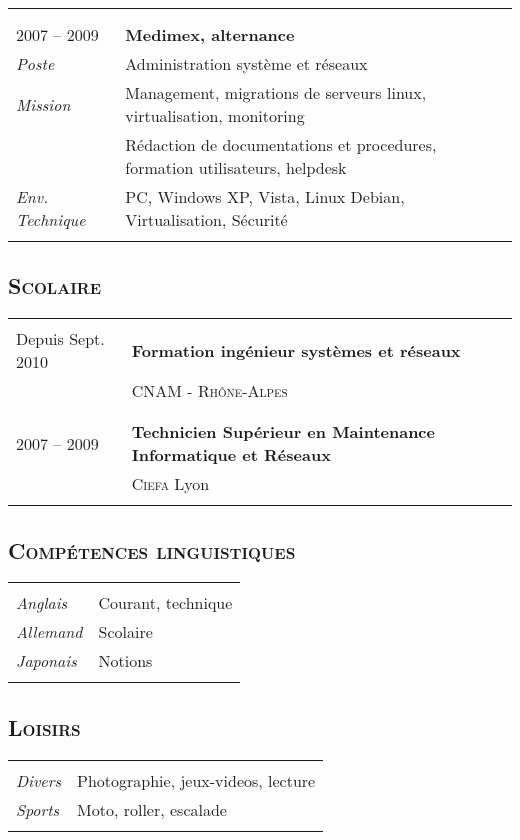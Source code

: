 \documentclass[a4paper,8pt]{article}
\newcommand{\hsubsection}[1]{\subsection*{\fontfamily{phv}\selectfont\textsc{#1}}}
\begin{document}
\begin{tabular}{P{3.5cm}|p{13cm}}
 & \\
 & \\
2007 -- 2009 			& \textbf{Medimex, alternance}\\
\textsl{Poste}			& Administration système et réseaux\\
\textsl{Mission}		& Management, migrations de serveurs linux, virtualisation, monitoring\\
				& Rédaction de documentations et procedures, formation utilisateurs, helpdesk\\
\textsl{Env. Technique}		& PC, Windows XP, Vista, Linux Debian, Virtualisation, Sécurité\\
 & \\
\end{tabular}

\newpage
\hsubsection{Scolaire}
\begin{tabular}{P{3.5cm}|p{13cm}}
 & \\
Depuis Sept. 2010		& \textbf{Formation ingénieur systèmes et réseaux}\\
				& \textsc{CNAM - Rhône-Alpes}\\
 & \\
 & \\
2007 -- 2009 			& \textbf{Technicien Supérieur en Maintenance Informatique et Réseaux}\\
				& \textsc{Ciefa} Lyon\\
 & \\
\end{tabular}

\hsubsection{Compétences linguistiques}
\begin{tabular}{P{3.5cm}|p{13cm}}
 & \\
\textsl{Anglais}		& Courant, technique\\
\textsl{Allemand}		& Scolaire\\
\textsl{Japonais}		& Notions\\
 & \\
\end{tabular}

\hsubsection{Loisirs}
\begin{tabular}{P{3.5cm}|p{13cm}}
 & \\
\textsl{Divers}			& Photographie, jeux-videos, lecture\\
\textsl{Sports}			& Moto, roller, escalade\\
 & \\
\end{tabular}
\end{document}
